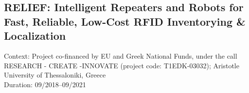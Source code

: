 \subsection{RELIEF: Intelligent Repeaters and Robots for Fast, Reliable, Low-Cost RFID Inventorying \& Localization}

Context: Project co-financed by EU and Greek National Funds, under the call RESEARCH - CREATE -INNOVATE (project code: T1EDK-03032); Aristotle University of Thessaloniki, Greece\\

\noindent Duration: 09/2018--09/2021\\

